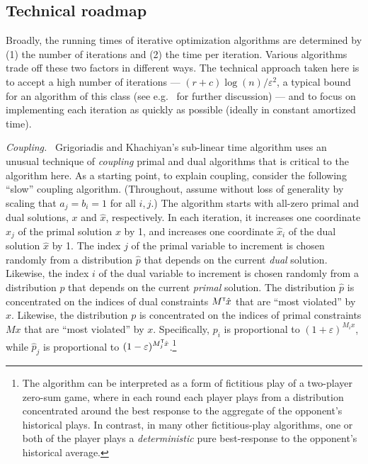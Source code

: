 \documentclass[11pt]{svjour3} \usepackage{fullpage}
\renewcommand{\paragraph}[1]{\smallskip\vspace{2pt}\par{\em #1}~}
\newcommand{\primalOf}[1]{{{#1}}}
\newcommand{\dualOf}[1]{{\hat{#1}}}
\newcommand{\xp}{\primalOf x}
\newcommand{\pp}{\primalOf p}
\newcommand{\xd}{\dualOf x}
\newcommand{\pd}{\dualOf p}
\newcommand{\eps}{\varepsilon}
\newcommand{\tran}{^{\scriptscriptstyle \sf T\hspace*{-0.05em}}}
\begin{document}
\subsection{Technical roadmap}
Broadly, the running times of iterative optimization algorithms are determined by (1) the number of iterations and (2) the time per iteration.  Various algorithms trade off these two factors in different ways.  The technical approach taken here is to accept a high number of iterations --- $(r+c)\log(n)/\eps^2$, a typical bound for an algorithm of this class
(see e.g.~\cite{Klein99Number} for further discussion) ---
and to focus on implementing each iteration as quickly as possible
(ideally in constant amortized time).

\paragraph{Coupling.}
Grigoriadis and Khachiyan's sub-linear time algorithm
uses an unusual technique of {\em coupling} primal and dual algorithms
that is critical to the algorithm here.
As a starting point, to explain coupling, consider the following ``slow'' coupling algorithm.
(Throughout, assume without loss of generality by scaling that $a_j = b_i = 1$ for all $i, j$.)
The algorithm starts with all-zero primal and dual solutions, $\xp$ and $\xd$, respectively.
In each iteration, it increases one coordinate $\xp_j$ of the primal solution $\xp$ by 1, 
and increases one coordinate $\xd_i$ of the dual solution $\xd$ by 1.
The index $j$ of the primal variable to increment is chosen randomly from a distribution $\pd$ that depends on the current {\em dual} solution.
Likewise, the index $i$ of the dual variable to increment is chosen randomly from a distribution $\pp$ that depends on the current {\em primal} solution.
The distribution $\pd$ is concentrated on the indices of dual constraints $M\tran \xd$ that are ``most violated'' by $\xd$.
Likewise, the distribution $\pp$ is concentrated on the indices of primal constraints $M \xp$ that are ``most violated'' by $\xp$.
Specifically, $\pp_i$ is proportional to $(1+\eps)^{M_i \xp}$,
while $\pd_j$ is proportional to $(1-\eps)^{M\tran_j \xd}$.\footnote{
The algorithm can be interpreted as a form of fictitious play of a two-player zero-sum game, where in each round each player plays from a distribution concentrated around the best response to the aggregate of the opponent's historical plays.  In contrast, in many other fictitious-play algorithms, one or both of the player plays a {\em deterministic} pure best-response to the opponent's historical average.}
\end{document}
